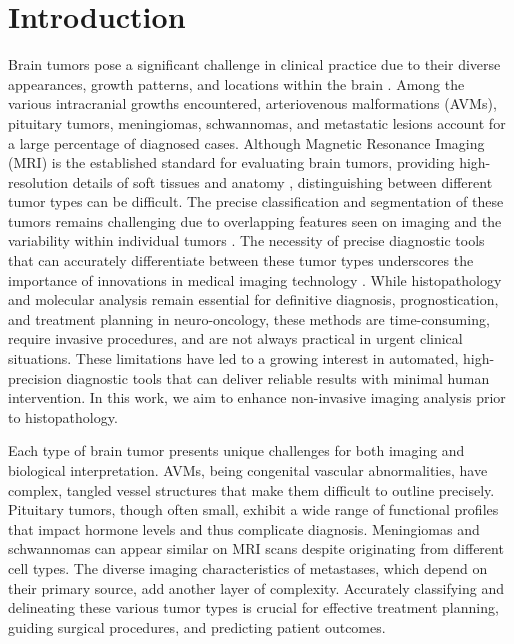 \section{Introduction}
Brain tumors pose a significant challenge in clinical practice due to their diverse appearances, growth patterns, and locations within the brain \cite{1}. Among the various intracranial growths encountered, arteriovenous malformations (AVMs), pituitary tumors, meningiomas, schwannomas, and metastatic lesions account for a large percentage of diagnosed cases. Although Magnetic Resonance Imaging (MRI) is the established standard for evaluating brain tumors, providing high-resolution details of soft tissues and anatomy \cite{2}, distinguishing between different tumor types can be difficult. The precise classification and segmentation of these tumors remains challenging due to overlapping features seen on imaging and the variability within individual tumors \cite{3,4}. The necessity of precise diagnostic tools that can accurately differentiate between these tumor types underscores the importance of innovations in medical imaging technology \cite{5,6}. While histopathology and molecular analysis remain essential for definitive diagnosis, prognostication, and treatment planning in neuro-oncology, these methods are time-consuming, require invasive procedures, and are not always practical in urgent clinical situations. These limitations have led to a growing interest in automated, high-precision diagnostic tools that can deliver reliable results with minimal human intervention. In this work, we aim to enhance non-invasive imaging analysis prior to histopathology.

Each type of brain tumor presents unique challenges for both imaging and biological interpretation. AVMs, being congenital vascular abnormalities, have complex, tangled vessel structures that make them difficult to outline precisely. Pituitary tumors, though often small, exhibit a wide range of functional profiles that impact hormone levels and thus complicate diagnosis. Meningiomas and schwannomas can appear similar on MRI scans despite originating from different cell types. The diverse imaging characteristics of metastases, which depend on their primary source, add another layer of complexity. Accurately classifying and delineating these various tumor types is crucial for effective treatment planning, guiding surgical procedures, and predicting patient outcomes.

